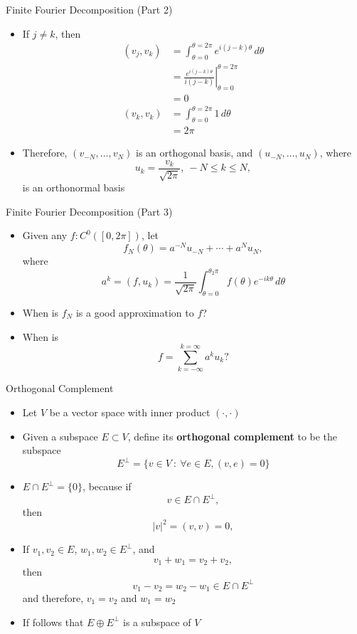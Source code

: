 \documentclass[usenames,dvipsnames,10pt]{beamer}
\begin{document}
\begin{frame}
  {Finite Fourier Decomposition (Part 2)}

  \begin{itemize}
  \item If $j \ne k$, then
    \begin{align*}
      (v_j,v_k) &= \int_{\theta=0}^{\theta=2\pi} e^{i(j-k)\theta}\,d\theta\\
                &= \left.\frac{e^{i(j-k)\theta}}{i(j-k)}\right|_{\theta=0}^{\theta=2\pi}\\
                &= 0\\
      (v_k,v_k) &= \int_{\theta=0}^{\theta=2\pi} 1\,d\theta\\
                &= 2\pi
    \end{align*}
  \item Therefore, $(v_{-N}, \dots, v_N)$ is an orthogonal basis, and
    $(u_{-N}, \dots, u_N)$, where
    \[ u_k = \frac{v_k}{\sqrt{2\pi}},\ -N \le k \le N, \]
    is an orthonormal basis
  \end{itemize}
\end{frame}

\begin{frame}
  {Finite Fourier Decomposition (Part 3)}

  \begin{itemize}
  \item Given any $f: C^0([0,2\pi])$, let
    \[
      f_N(\theta) = a^{-N}u_{-N} + \cdots + a^Nu_N,
    \]
    where
    \[
      a^k = (f,u_k) = \frac{1}{\sqrt{2\pi}}\int_{\theta=0}^{\theta_2\pi} f(\theta)e^{-ik\theta}\,d\theta
    \]
  \item When is $f_N$ is a good approximation to $f$?
  \item When is
    \[
      f = \sum_{k=-\infty}^{k=\infty} a^ku_k?
    \]
  \end{itemize}
\end{frame}

\begin{frame}
  {Orthogonal Complement}

  \begin{itemize}
  \item Let $V$ be a vector space with inner product $(\cdot,\cdot)$
  \item Given a subspace $E \subset V$, define its {\bf orthogonal complement} to be the subspace
    \[
      E^\perp = \{ v \in V\ :\ \forall e \in E, (v,e) = 0 \}
    \]
  \item $E\cap E^\perp = \{0\}$, because if
    \[ v \in E\cap E^\perp, \]
    then \[ |v|^2 = (v,v) = 0, \]
  \item If $v_1, v_2 \in E$, $w_1,w_2 \in E^\perp$, and
    \[
      v_1+w_1 = v_2+v_2,
    \]
    then
    \[
      v_1-v_2 = w_2-w_1 \in E\cap E^\perp
    \]
    and therefore, $v_1 = v_2$ and $w_1 = w_2$
  \item If follows that $E\oplus E^\perp$ is a subspace of $V$
  \end{itemize}
\end{frame}
\end{document}
